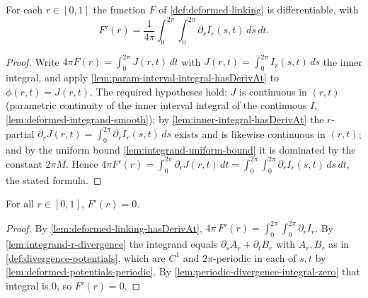 \begin{lemma}
    \label{lem:deformed-linking-hasDerivAt}
    For each $r\in[0,1]$ the function $F$ of \cref{def:deformed-linking} is
    differentiable, with
    \[
        F'(r) = \frac{1}{4\pi}\int_0^{2\pi}\!\!\int_0^{2\pi}\partial_r I_r(s,t)\,ds\,dt .
    \]
\end{lemma}
\begin{proof}
    Write $4\pi F(r)=\int_0^{2\pi} J(r,t)\,dt$ with $J(r,t)=\int_0^{2\pi}I_r(s,t)\,ds$
    the inner integral, and apply \cref{lem:param-interval-integral-hasDerivAt} to
    $\phi(r,t)=J(r,t)$. The required hypotheses hold: $J$ is continuous in $(r,t)$
    (parametric continuity of the inner interval integral of the continuous $I$,
    \cref{lem:deformed-integrand-smooth}); by \cref{lem:inner-integral-hasDerivAt}
    the $r$-partial $\partial_r J(r,t)=\int_0^{2\pi}\partial_r I_r(s,t)\,ds$ exists
    and is likewise continuous in $(r,t)$; and by the uniform bound
    \cref{lem:integrand-uniform-bound} it is dominated by the constant $2\pi M$.
    Hence $4\pi F'(r)=\int_0^{2\pi}\partial_r J(r,t)\,dt=
     \int_0^{2\pi}\!\int_0^{2\pi}\partial_r I_r(s,t)\,ds\,dt$, the stated formula.
\end{proof}

\begin{lemma}
    \label{lem:deformed-linking-deriv-zero}
    For all $r\in[0,1]$, $F'(r) = 0$.
\end{lemma}
\begin{proof}
    By \cref{lem:deformed-linking-hasDerivAt},
    $4\pi\,F'(r) = \int_0^{2\pi}\!\int_0^{2\pi}\partial_r I_r$. By
    \cref{lem:integrand-r-divergence} the integrand equals
    $\partial_s A_r + \partial_t B_r$ with $A_r,B_r$ as in
    \cref{def:divergence-potentials}, which are $C^1$ and $2\pi$-periodic in each of
    $s,t$ by \cref{lem:deformed-potentials-periodic}. By
    \cref{lem:periodic-divergence-integral-zero} that integral is $0$, so
    $F'(r) = 0$.
\end{proof}

